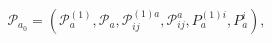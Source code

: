 \begin{equation}
\mathcal{P}_{a_{0}}=\left( \mathcal{P}_{a}^{(1)},\mathcal{P}_{a},\mathcal{P}%
_{ij}^{(1)a},\mathcal{P}_{ij}^{a},P_{a}^{(1)i},P_{a}^{i}\right) ,
\label{f20}
\end{equation}

